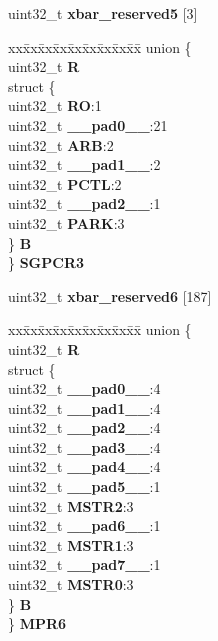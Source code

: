 \begin{DoxyCompactItemize}
\begin{tabbing}
\end{tabbing}\item 
\mbox{\label{structXBAR__tag_af3bbad9c1ec48657882982ce3b6fc38b}} 
uint32\+\_\+t {\bfseries xbar\+\_\+reserved5} \mbox{[}3\mbox{]}
\item 
\mbox{\label{structXBAR__tag_ae8e55dea0ef858675843e38a74484e4e}} 
\begin{tabbing}
xx\=xx\=xx\=xx\=xx\=xx\=xx\=xx\=xx\=\kill
union \{\\
\>uint32\_t {\bfseries R}\\
\>struct \{\\
\>\>uint32\_t {\bfseries RO}:1\\
\>\>uint32\_t {\bfseries \_\_pad0\_\_}:21\\
\>\>uint32\_t {\bfseries ARB}:2\\
\>\>uint32\_t {\bfseries \_\_pad1\_\_}:2\\
\>\>uint32\_t {\bfseries PCTL}:2\\
\>\>uint32\_t {\bfseries \_\_pad2\_\_}:1\\
\>\>uint32\_t {\bfseries PARK}:3\\
\>\} {\bfseries B}\\
\} {\bfseries SGPCR3}\\

\end{tabbing}\item 
\mbox{\label{structXBAR__tag_a2c96131799371d2f0cba836a3c184aa3}} 
uint32\+\_\+t {\bfseries xbar\+\_\+reserved6} \mbox{[}187\mbox{]}
\item 
\mbox{\label{structXBAR__tag_a9fc1efc345a4bea5a527d3ee05fc1db2}} 
\begin{tabbing}
xx\=xx\=xx\=xx\=xx\=xx\=xx\=xx\=xx\=\kill
union \{\\
\>uint32\_t {\bfseries R}\\
\>struct \{\\
\>\>uint32\_t {\bfseries \_\_pad0\_\_}:4\\
\>\>uint32\_t {\bfseries \_\_pad1\_\_}:4\\
\>\>uint32\_t {\bfseries \_\_pad2\_\_}:4\\
\>\>uint32\_t {\bfseries \_\_pad3\_\_}:4\\
\>\>uint32\_t {\bfseries \_\_pad4\_\_}:4\\
\>\>uint32\_t {\bfseries \_\_pad5\_\_}:1\\
\>\>uint32\_t {\bfseries MSTR2}:3\\
\>\>uint32\_t {\bfseries \_\_pad6\_\_}:1\\
\>\>uint32\_t {\bfseries MSTR1}:3\\
\>\>uint32\_t {\bfseries \_\_pad7\_\_}:1\\
\>\>uint32\_t {\bfseries MSTR0}:3\\
\>\} {\bfseries B}\\
\} {\bfseries MPR6}\\


\end{tabbing}
\end{DoxyCompactItemize}
